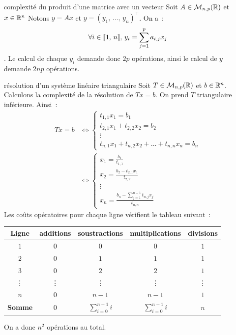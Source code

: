 \begin{exemple}{}{complexité du produit d'une matrice avec un vecteur}
    Soit $A \in \mathcal{M}_{n,p}(\mathbb{R})$ et $x \in \mathbb{R}^n$
    Notons $y = Ax$ et $y = (y_1,\, \dots,\, y_n)^\top$. On a~:
    $$\forall i \in \llbracket 1 ,\, n \rrbracket,\, y_i = \sum_{j=1}^p a_{i,j} x_j$$.
    Le calcul de chaque $y_i$ demande donc $2p$ opérations, ainsi le calcul de $y$ demande $2np$ opérations.
    
\end{exemple}

\begin{exemple}{}{résolution d'un système linéaire triangulaire}
    Soit $T \in \mathcal{M}_{n,p}(\mathbb{R})$ et $b \in \mathbb{R}^n$. Calculons la complexité de la résolution de $Tx = b$. On prend $T$ triangulaire inférieure. Ainsi~:
    \begin{align*}
        Tx = b &\Leftrightarrow \begin{cases}
            t_{1,1}x_1 = b_1\\
            t_{2,1}x_1 + t_{2,2}x_2 = b_2\\
            \vdots\\
            t_{n,1}x_1 + t_{n,2}x_2 + \dots + t_{n,n}x_n = b_n
        \end{cases}\\
        &\Leftrightarrow \begin{cases}
            x_1 = \frac{b_1}{t_{1,1}}\\
            x_2 = \frac{b_2 - t_{2,1}x_1}{t_{2,2}}\\
            \vdots\\
            x_n = \frac{b_n - \sum_{j=1}^{n-1} t_{n,j}x_j}{t_{n,n}}
        \end{cases}
    \end{align*}
    Les coûts opératoires pour chaque ligne vérifient le tableau suivant~:
    \begin{center}
        \begin{tabular}{c|c|c|c|c|}
            \textbf{Ligne} & \textbf{additions} & \textbf{soustractions} &\textbf{multiplications} & \textbf{divisions}\\
            \hline
            $1$ & $0$ & $0$ & $0$ & $1$\\
            \hline
            $2$ & $0$ & $1$ & $1$ & $1$\\
            \hline
            $3$ & $0$ & $2$ & $2$ & $1$\\
            \hline
            \vdots & \vdots & \vdots & \vdots & \vdots\\
            \hline
            $n$ & $0$ & $n-1$ & $n-1$ & $1$\\
            \hhline{=|=|=|=|=|}
            \textbf{Somme} & $0$ & $\displaystyle\sum_{i=0}^{n-1} i$ & $\displaystyle\sum_{i=0}^{n-1} i$ & $n$\\
        \end{tabular}
    \end{center}
    On a donc $n^2$ opérations au total.
    
    
\end{exemple}


